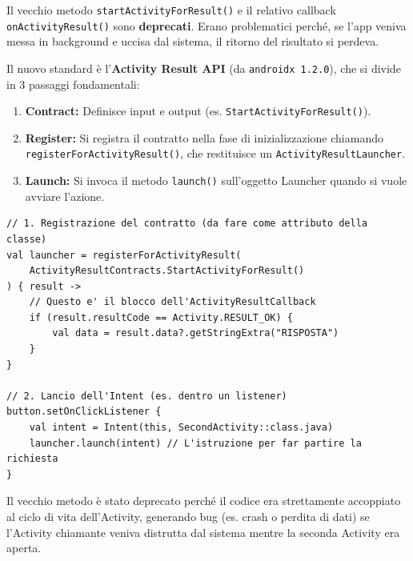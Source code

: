 \begin{tcolorbox}[colback=red!5!white,colframe=red!75!black,title=Attenzione all'esame: Deprecazione!]
    Il vecchio metodo \texttt{startActivityForResult()} e il relativo callback \texttt{onActivityResult()} sono \textbf{deprecati}.
    Erano problematici perché, se l'app veniva messa in background e uccisa dal sistema, il ritorno del risultato si perdeva.
\end{tcolorbox}

Il nuovo standard è l'\textbf{Activity Result API} (da \texttt{androidx 1.2.0}), che si divide in 3 passaggi fondamentali:
\begin{enumerate}
    \item \textbf{Contract:} Definisce input e output (es. \texttt{StartActivityForResult()}).
    \item \textbf{Register:} Si registra il contratto nella fase di inizializzazione chiamando \texttt{registerForActivityResult()}, che restituisce un \texttt{ActivityResultLauncher}.
    \item \textbf{Launch:} Si invoca il metodo \texttt{launch()} sull'oggetto Launcher quando si vuole avviare l'azione.
\end{enumerate}

\begin{lstlisting}[caption={Ottenere un risultato con Activity Result API (Esatto da Quiz)}]
// 1. Registrazione del contratto (da fare come attributo della classe)
val launcher = registerForActivityResult(
    ActivityResultContracts.StartActivityForResult()
) { result ->
    // Questo e' il blocco dell'ActivityResultCallback
    if (result.resultCode == Activity.RESULT_OK) {
        val data = result.data?.getStringExtra("RISPOSTA")
    }
}

// 2. Lancio dell'Intent (es. dentro un listener)
button.setOnClickListener {
    val intent = Intent(this, SecondActivity::class.java)
    launcher.launch(intent) // L'istruzione per far partire la richiesta
}
\end{lstlisting}
\begin{tcolorbox}[colback=yellow!10!white,colframe=yellow!70!black,title=Perché \texttt{startActivityForResult} è deprecato?]
    Il vecchio metodo è stato deprecato perché il codice era strettamente accoppiato al ciclo di vita dell'Activity, generando bug (es.
    crash o perdita di dati) se l'Activity chiamante veniva distrutta dal sistema mentre la seconda Activity era aperta.
\end{tcolorbox}

